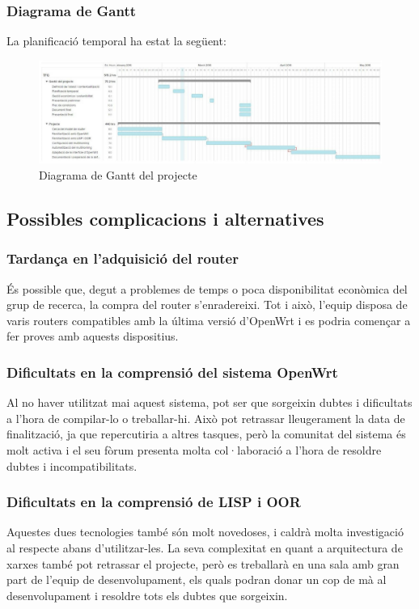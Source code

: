 \documentclass[11pt]{article}
\begin{document}
	\subsubsection{Diagrama de Gantt}
	La planificació temporal ha estat la següent:\\
	\begin{figure}[h]
		\centering
		\includegraphics[width=14cm]{gantt1}
		\caption{Diagrama de Gantt del projecte}
	\end{figure}	

\subsection{Possibles complicacions i alternatives}
\subsubsection{Tardança en l’adquisició del router}
És possible que, degut a problemes de temps o poca disponibilitat econòmica del grup de recerca, la compra del router s’enradereixi. Tot i això, l’equip disposa de varis routers compatibles amb la última versió d’OpenWrt i es podria començar a fer proves amb aquests dispositius.
\subsubsection{Dificultats en la comprensió del sistema OpenWrt}
Al no haver utilitzat mai aquest sistema, pot ser que sorgeixin dubtes i dificultats a l’hora de compilar-lo o treballar-hi. Això pot retrassar lleugerament la data de finalització, ja que repercutiria a altres tasques, però la comunitat del sistema és molt activa i el seu fòrum presenta molta col·laboració a l’hora de resoldre dubtes i incompatibilitats.
\subsubsection{Dificultats en la comprensió de LISP i OOR}
Aquestes dues tecnologies també són molt novedoses, i caldrà molta investigació al respecte abans d’utilitzar-les. La seva complexitat en quant a arquitectura de xarxes també pot retrassar el projecte, però es treballarà en una sala amb gran part de l’equip de desenvolupament, els quals podran donar un cop de mà al desenvolupament i resoldre tots els dubtes que sorgeixin.
\end{document}
